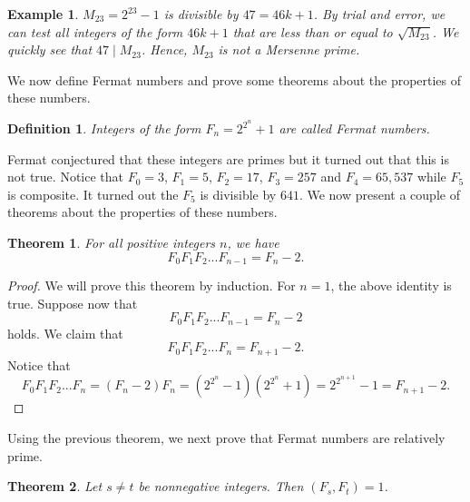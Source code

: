 \documentclass[12pt,letterpaper]{book}
\newtheorem{definition}{Definition}
\newtheorem{theorem}{Theorem}
\newtheorem{example}{Example}
\begin{document}
\begin{example}
$M_{23}=2^{23}-1$ is divisible by $47=46k+1$.  By trial and error, we can test all integers of the form $46k+1$ that are less than or equal to $\sqrt{M_{23}}$.  We quickly see that $47\mid M_{23}$.  Hence, $M_{23}$ is not a Mersenne prime.
\end{example}

We now define Fermat numbers and prove some theorems about the
properties of these numbers. 
\begin{definition}
Integers of the form $F_n=2^{2^n}+1$ are called Fermat numbers.
\end{definition}

Fermat conjectured that these integers are primes but it turned out
that this is not true.  Notice that $F_0=3$, $F_1=5$, $F_2=17$,
$F_3=257$ and $F_4=65,537$ while $F_5$ is composite. It turned out
the $F_5$ is divisible by $641$.  We now present a couple of
theorems about the properties of these numbers.

\begin{theorem}\label{fermatnum}
For all positive integers $n$, we have
\begin{equation*}
F_0F_1F_2...F_{n-1}=F_n-2.
\end{equation*}
\end{theorem}

\begin{proof}
We will prove this theorem by induction.  For $n=1$, the above
identity is true.  Suppose now that
\begin{equation*}
F_0F_1F_2...F_{n-1}=F_n-2
\end{equation*}
holds.  We claim that
\begin{equation*}
F_0F_1F_2...F_{n}=F_{n+1}-2.
\end{equation*}
Notice that
\begin{equation*}
F_0F_1F_2...F_{n}=(F_n-2)F_n=(2^{2^n}-1)(2^{2^n}+1)=2^{2^{n+1}}-1=F_{n+1}-2.
\end{equation*}
\end{proof}
Using the previous theorem, we next prove that Fermat numbers are relatively prime.

\begin{theorem}
Let $s \neq t$ be nonnegative integers.  Then $(F_s,F_t)=1$.
\end{theorem}
\end{document}
